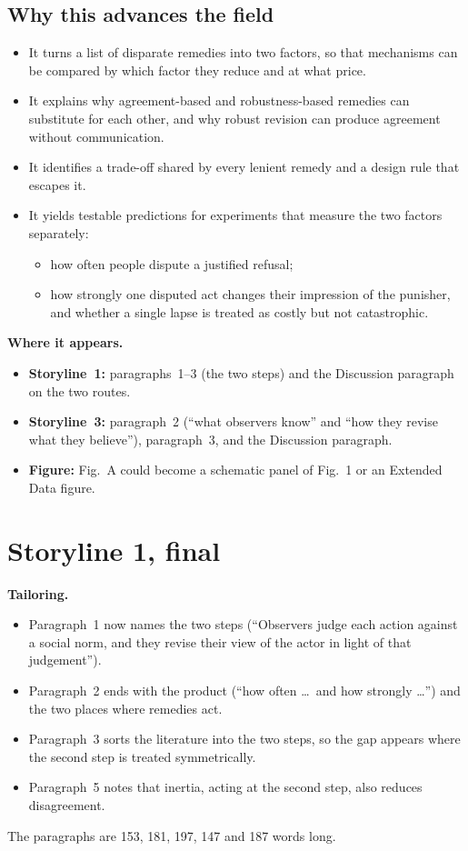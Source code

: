 \documentclass[11pt]{article}
\begin{document}
\subsection*{Why this advances the field}
\begin{itemize}[leftmargin=1.2em]
\item It turns a list of disparate remedies into two factors, so that mechanisms can be compared by which factor they reduce and at what price.
\item It explains why agreement-based and robustness-based remedies can substitute for each other, and why robust revision can produce agreement without communication.
\item It identifies a trade-off shared by every lenient remedy and a design rule that escapes it.
\item It yields testable predictions for experiments that measure the two factors separately:
  \begin{itemize}[leftmargin=1.2em]
  \item how often people dispute a justified refusal;
  \item how strongly one disputed act changes their impression of the punisher, and whether a single lapse is treated as costly but not catastrophic.
  \end{itemize}
\end{itemize}

\textbf{Where it appears.}
\begin{itemize}[leftmargin=1.2em]
\item \textbf{Storyline~1:} paragraphs~1--3 (the two steps) and the Discussion paragraph on the two routes.
\item \textbf{Storyline~3:} paragraph~2 (``what observers know'' and ``how they revise what they believe''), paragraph~3, and the Discussion paragraph.
\item \textbf{Figure:} Fig.~A could become a schematic panel of Fig.~1 or an Extended Data figure.
\end{itemize}

\section{Storyline 1, final}

\textbf{Tailoring.}
\begin{itemize}[leftmargin=1.2em]
\item Paragraph~1 now names the two steps (``Observers judge each action against a social norm, and they revise their view of the actor in light of that judgement'').
\item Paragraph~2 ends with the product (``how often \dots\ and how strongly \dots'') and the two places where remedies act.
\item Paragraph~3 sorts the literature into the two steps, so the gap appears where the second step is treated symmetrically.
\item Paragraph~5 notes that inertia, acting at the second step, also reduces disagreement.
\end{itemize}
The paragraphs are 153, 181, 197, 147 and 187 words long.
\end{document}
